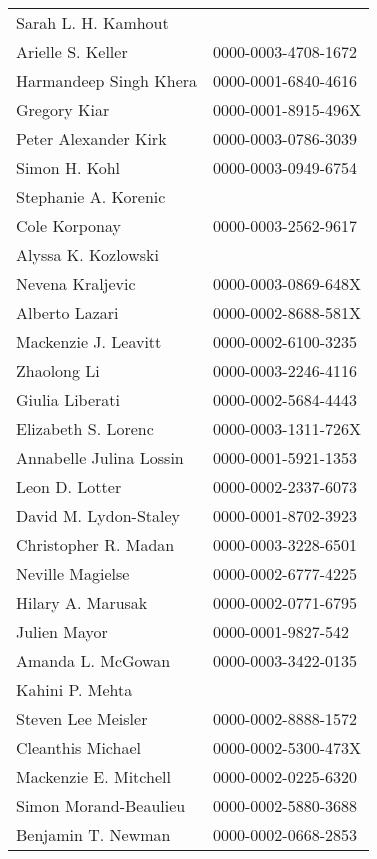 \begin{longtable}{ll}
       Sarah L. H. Kamhout &                     \\
         Arielle S. Keller & 0000-0003-4708-1672 \\
    Harmandeep Singh Khera & 0000-0001-6840-4616 \\
              Gregory Kiar & 0000-0001-8915-496X \\
      Peter Alexander Kirk & 0000-0003-0786-3039 \\
             Simon H. Kohl & 0000-0003-0949-6754 \\
      Stephanie A. Korenic &                     \\
             Cole Korponay & 0000-0003-2562-9617 \\
       Alyssa K. Kozlowski &                     \\
          Nevena Kraljevic & 0000-0003-0869-648X \\
            Alberto Lazari & 0000-0002-8688-581X \\
      Mackenzie J. Leavitt & 0000-0002-6100-3235 \\
               Zhaolong Li & 0000-0003-2246-4116 \\
           Giulia Liberati & 0000-0002-5684-4443 \\
       Elizabeth S. Lorenc & 0000-0003-1311-726X \\
   Annabelle Julina Lossin & 0000-0001-5921-1353 \\
            Leon D. Lotter & 0000-0002-2337-6073 \\
     David M. Lydon-Staley & 0000-0001-8702-3923 \\
      Christopher R. Madan & 0000-0003-3228-6501 \\
          Neville Magielse & 0000-0002-6777-4225 \\
         Hilary A. Marusak & 0000-0002-0771-6795 \\
              Julien Mayor &  0000-0001-9827-542 \\
         Amanda L. McGowan & 0000-0003-3422-0135 \\
           Kahini P. Mehta &                     \\
        Steven Lee Meisler & 0000-0002-8888-1572 \\
         Cleanthis Michael & 0000-0002-5300-473X \\
     Mackenzie E. Mitchell & 0000-0002-0225-6320 \\
     Simon Morand-Beaulieu & 0000-0002-5880-3688 \\
        Benjamin T. Newman & 0000-0002-0668-2853 \\

\end{longtable}

